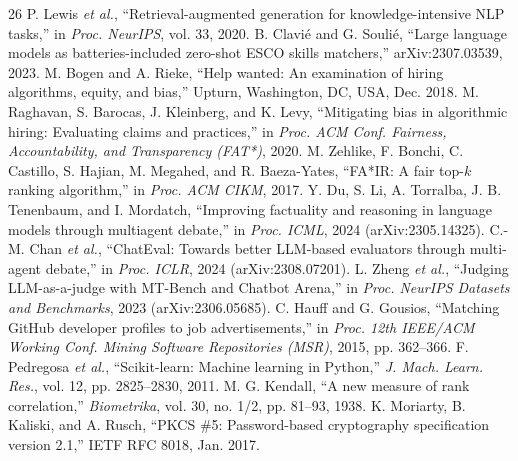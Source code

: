 \documentclass[conference]{IEEEtran}
\begin{document}
\begin{thebibliography}{26}
 P. Lewis \textit{et al.}, ``Retrieval-augmented generation for knowledge-intensive NLP tasks,'' in \textit{Proc. NeurIPS}, vol. 33, 2020.
 B. Clavi\'e and G. Souli\'e, ``Large language models as batteries-included zero-shot ESCO skills matchers,'' arXiv:2307.03539, 2023.
 M. Bogen and A. Rieke, ``Help wanted: An examination of hiring algorithms, equity, and bias,'' Upturn, Washington, DC, USA, Dec. 2018.
 M. Raghavan, S. Barocas, J. Kleinberg, and K. Levy, ``Mitigating bias in algorithmic hiring: Evaluating claims and practices,'' in \textit{Proc. ACM Conf. Fairness, Accountability, and Transparency (FAT*)}, 2020.
 M. Zehlike, F. Bonchi, C. Castillo, S. Hajian, M. Megahed, and R. Baeza-Yates, ``FA*IR: A fair top-$k$ ranking algorithm,'' in \textit{Proc. ACM CIKM}, 2017.
 Y. Du, S. Li, A. Torralba, J. B. Tenenbaum, and I. Mordatch, ``Improving factuality and reasoning in language models through multiagent debate,'' in \textit{Proc. ICML}, 2024 (arXiv:2305.14325).
 C.-M. Chan \textit{et al.}, ``ChatEval: Towards better LLM-based evaluators through multi-agent debate,'' in \textit{Proc. ICLR}, 2024 (arXiv:2308.07201).
 L. Zheng \textit{et al.}, ``Judging LLM-as-a-judge with MT-Bench and Chatbot Arena,'' in \textit{Proc. NeurIPS Datasets and Benchmarks}, 2023 (arXiv:2306.05685).
 C. Hauff and G. Gousios, ``Matching GitHub developer profiles to job advertisements,'' in \textit{Proc. 12th IEEE/ACM Working Conf. Mining Software Repositories (MSR)}, 2015, pp. 362--366.
 F. Pedregosa \textit{et al.}, ``Scikit-learn: Machine learning in Python,'' \textit{J. Mach. Learn. Res.}, vol. 12, pp. 2825--2830, 2011.
 M. G. Kendall, ``A new measure of rank correlation,'' \textit{Biometrika}, vol. 30, no. 1/2, pp. 81--93, 1938.
 K. Moriarty, B. Kaliski, and A. Rusch, ``PKCS \#5: Password-based cryptography specification version 2.1,'' IETF RFC 8018, Jan. 2017.
\end{thebibliography}
\end{document}
